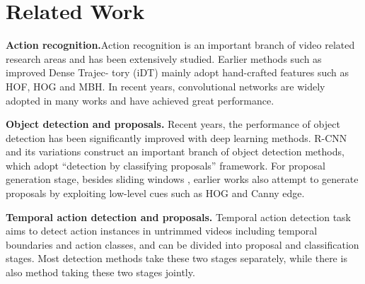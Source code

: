 \documentclass[10pt,twocolumn,letterpaper]{article}
\begin{document}
\section{Related Work}
\noindent\textbf{Action recognition.}Action recognition is an important branch of video related research
areas and has been extensively studied. Earlier methods such as improved Dense Trajec-
tory (iDT)  mainly adopt hand-crafted features such as HOF, HOG and MBH. In
recent years, convolutional networks are widely adopted in many works \cite{feichtenhofer2016convolutional,simonyan2014two,tran2015learning,wang2015towards}
and have achieved great performance.
\par
\noindent\textbf{Object detection and proposals.} Recent years, the performance of object detection has
been significantly improved with deep learning methods. R-CNN  and its variations
 construct an important branch of object detection methods, which adopt ``detection by classifying proposals'' framework. For proposal generation stage, besides sliding
windows , earlier works also attempt to generate proposals by exploiting low-level
cues such as HOG and Canny edge.
\par
\noindent\textbf{Temporal action detection and proposals.} Temporal action detection task aims to
detect action instances in untrimmed videos including temporal boundaries and action classes, and can be divided into proposal and classification stages. Most detection methods \cite{singh2016untrimmed} take these two stages separately, while there is also method \cite{buch2017sst} taking
these two stages jointly.


\end{document}
